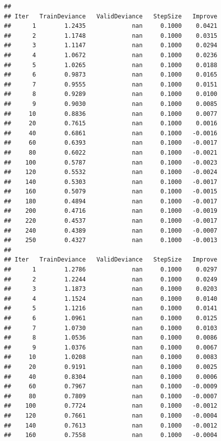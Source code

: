 \documentclass[
]{book}
\begin{document}
\begin{verbatim}
## 
## Iter   TrainDeviance   ValidDeviance   StepSize   Improve
##      1        1.2435             nan     0.1000    0.0421
##      2        1.1748             nan     0.1000    0.0315
##      3        1.1147             nan     0.1000    0.0294
##      4        1.0672             nan     0.1000    0.0236
##      5        1.0265             nan     0.1000    0.0188
##      6        0.9873             nan     0.1000    0.0165
##      7        0.9555             nan     0.1000    0.0151
##      8        0.9289             nan     0.1000    0.0100
##      9        0.9030             nan     0.1000    0.0085
##     10        0.8836             nan     0.1000    0.0077
##     20        0.7615             nan     0.1000    0.0016
##     40        0.6861             nan     0.1000   -0.0016
##     60        0.6393             nan     0.1000   -0.0017
##     80        0.6022             nan     0.1000   -0.0021
##    100        0.5787             nan     0.1000   -0.0023
##    120        0.5532             nan     0.1000   -0.0024
##    140        0.5303             nan     0.1000   -0.0017
##    160        0.5079             nan     0.1000   -0.0015
##    180        0.4894             nan     0.1000   -0.0017
##    200        0.4716             nan     0.1000   -0.0019
##    220        0.4537             nan     0.1000   -0.0017
##    240        0.4389             nan     0.1000   -0.0007
##    250        0.4327             nan     0.1000   -0.0013
## 
## Iter   TrainDeviance   ValidDeviance   StepSize   Improve
##      1        1.2786             nan     0.1000    0.0297
##      2        1.2244             nan     0.1000    0.0249
##      3        1.1873             nan     0.1000    0.0203
##      4        1.1524             nan     0.1000    0.0140
##      5        1.1216             nan     0.1000    0.0141
##      6        1.0961             nan     0.1000    0.0125
##      7        1.0730             nan     0.1000    0.0103
##      8        1.0536             nan     0.1000    0.0086
##      9        1.0376             nan     0.1000    0.0067
##     10        1.0208             nan     0.1000    0.0083
##     20        0.9191             nan     0.1000    0.0025
##     40        0.8304             nan     0.1000    0.0006
##     60        0.7967             nan     0.1000   -0.0009
##     80        0.7809             nan     0.1000   -0.0007
##    100        0.7724             nan     0.1000   -0.0012
##    120        0.7661             nan     0.1000   -0.0004
##    140        0.7613             nan     0.1000   -0.0012
##    160        0.7558             nan     0.1000   -0.0004

\end{verbatim}
\end{document}
